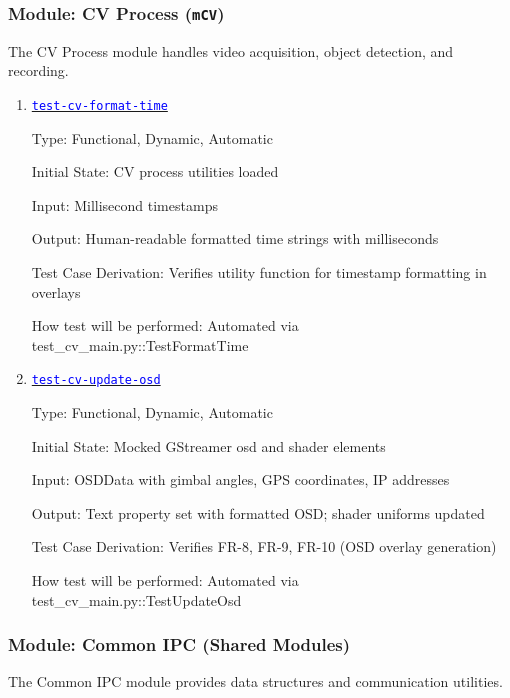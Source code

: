 \documentclass[12pt, titlepage]{article}
\newcommand{\mref}[1]{\texttt{#1}}
\newcommand{\tid}[1]{\hyperlink{tid:#1}{\textcolor{blue}{\texttt{#1}}}}
\begin{document}
\subsubsection{Module: CV Process (\mref{mCV})}

The CV Process module handles video acquisition, object detection, and
recording.

\begin{enumerate}

  \item{\tid{test-cv-format-time}\\}

        Type: Functional, Dynamic, Automatic

        Initial State: CV process utilities loaded

        Input: Millisecond timestamps

        Output: Human-readable formatted time strings with milliseconds

        Test Case Derivation: Verifies utility function for timestamp formatting in
        overlays

        How test will be performed: Automated via test\_cv\_main.py::TestFormatTime

  \item{\tid{test-cv-update-osd}\\}

        Type: Functional, Dynamic, Automatic

        Initial State: Mocked GStreamer osd and shader elements

        Input: OSDData with gimbal angles, GPS coordinates, IP addresses

        Output: Text property set with formatted OSD; shader uniforms updated

        Test Case Derivation: Verifies FR-8, FR-9, FR-10 (OSD overlay generation)

        How test will be performed: Automated via test\_cv\_main.py::TestUpdateOsd

\end{enumerate}

\subsubsection{Module: Common IPC (Shared Modules)}

The Common IPC module provides data structures and communication utilities.
\end{document}
